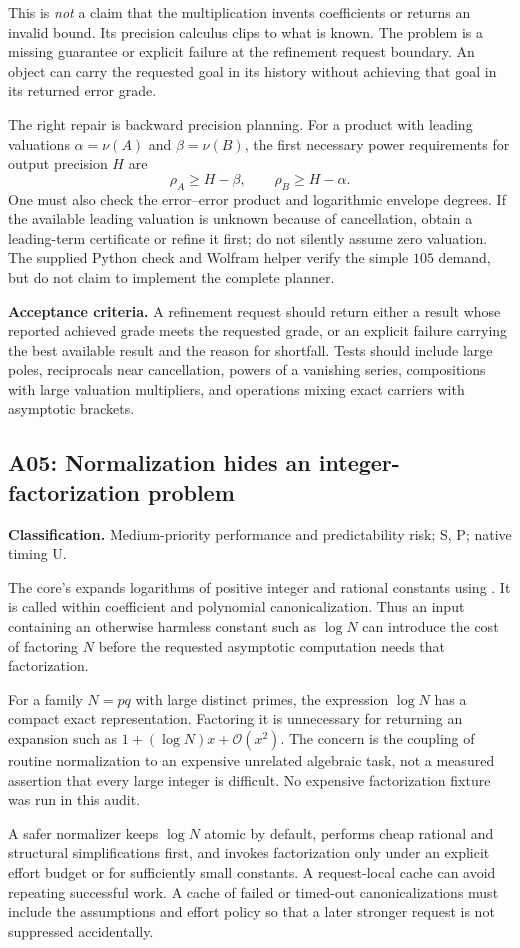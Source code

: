 \documentclass[11pt,a4paper]{article}
\newcommand{\code}[1]{\texttt{\detokenize{#1}}}
\newcommand{\OO}{\mathcal O}
\newcommand{\finding}[3]{\subsection{#1: #2}\textbf{Classification.} #3\par}
\begin{document}
This is \emph{not} a claim that the multiplication invents coefficients or
returns an invalid bound. Its precision calculus clips to what is known.
The problem is a missing guarantee or explicit failure at the refinement
request boundary. An object can carry the requested goal in its history
without achieving that goal in its returned error grade.

The right repair is backward precision planning. For a product with leading
valuations $\alpha=\nu(A)$ and $\beta=\nu(B)$, the first necessary power
requirements for output precision $H$ are
\[
 \rho_A\geq H-\beta,\qquad \rho_B\geq H-\alpha.
\]
One must also check the error--error product and logarithmic envelope
degrees. If the available leading valuation is unknown because of
cancellation, obtain a leading-term certificate or refine it first; do not
silently assume zero valuation. The supplied Python check and Wolfram
helper verify the simple $105$ demand, but do not claim to implement the
complete planner.

\textbf{Acceptance criteria.} A refinement request should return either a
result whose reported achieved grade meets the requested grade, or an
explicit failure carrying the best available result and the reason for
shortfall. Tests should include large poles, reciprocals near cancellation,
powers of a vanishing series, compositions with large valuation multipliers,
and operations mixing exact carriers with asymptotic brackets.

\finding{A05}{Normalization hides an integer-factorization problem}{Medium-priority performance and predictability risk; S, P; native timing U.}
The core's \code{logCanon} expands logarithms of positive integer and
rational constants using \code{FactorInteger}. It is called within
coefficient and polynomial canonicalization. Thus an input containing an
otherwise harmless constant such as $\log N$ can introduce the cost of
factoring $N$ before the requested asymptotic computation needs that
factorization.
\cite{core}

For a family $N=pq$ with large distinct primes, the expression $\log N$ has
a compact exact representation. Factoring it is unnecessary for returning
an expansion such as $1+(\log N)x+\OO(x^2)$. The concern is the coupling of
routine normalization to an expensive unrelated algebraic task, not a
measured assertion that every large integer is difficult. No expensive
factorization fixture was run in this audit.

A safer normalizer keeps $\log N$ atomic by default, performs cheap rational
and structural simplifications first, and invokes factorization only under
an explicit effort budget or for sufficiently small constants. A
request-local cache can avoid repeating successful work. A cache of failed
or timed-out canonicalizations must include the assumptions and effort
policy so that a later stronger request is not suppressed accidentally.
\end{document}
